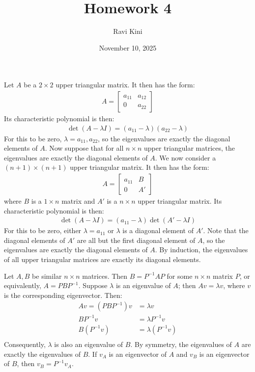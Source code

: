 \documentclass{article}
\title{Homework 4}
\author{Ravi Kini}
\date{November 10, 2025}
\begin{document}
\maketitle

\problem{}
Let $A$ be a $2 \times 2$ upper triangular matrix. It then has the form:
\begin{align*}
    A = \begin{bmatrix}
        a_{11} & a_{12} \\ 0 & a_{22}
    \end{bmatrix}
\end{align*}
Its characteristic polynomial is then:
\begin{align*}
    \det(A - \lambda I) = (a_{11} - \lambda)(a_{22} - \lambda)
\end{align*}
For this to be zero, $\lambda = a_{11}, a_{22}$, so the eigenvalues are exactly the diagonal elements of $A$. Now suppose that for all $n \times n$ upper triangular matrices, the eigenvalues are exactly the diagonal elements of $A$. We now consider a $(n + 1) \times (n + 1)$ upper triangular matrix. It then has the form:
\begin{align*}
    A = \begin{bmatrix}
        a_{11} & B \\ 0 & A'
    \end{bmatrix}
\end{align*}
where $B$ is a $1 \times n$ matrix and $A'$ is a $n \times n$ upper triangular matrix. Its characteristic polynomial is then:
\begin{align*}
    \det(A - \lambda I) = (a_{11} - \lambda)\det(A' - \lambda I)
\end{align*}
For this to be zero, either $\lambda = a_{11}$ or $\lambda$ is a diagonal element of $A'$. Note that the diagonal elements of $A'$ are all but the first diagonal element of $A$, so the eigenvalues are exactly the diagonal elements of $A$. By induction, the eigenvalues of all upper triangular matrices are exactly its diagonal elements.

\clearpage
\problem{}
Let $A, B$ be similar $n \times n$ matrices. Then $B = P^{-1}AP$ for some $n \times n$ matrix $P$, or equivalently, $A = PBP^{-1}$. Suppose $\lambda$ is an eigenvalue of $A$; then $Av = \lambda v$, where $v$ is the corresponding eigenvector. Then:
\begin{align*}
    Av = (PBP^{-1})v & = \lambda v \\
    BP^{-1}v & = \lambda P^{-1}v \\
    B(P^{-1}v) & = \lambda (P^{-1}v) \\
\end{align*}
Consequently, $\lambda$ is also an eigenvalue of $B$. By symmetry, the eigenvalues of $A$ are exactly the eigenvalues of $B$.
If $v_A$ is an eigenvector of $A$ and $v_B$ is an eigenvector of $B$, then $v_B = P^{-1}v_A$.
\end{document}
